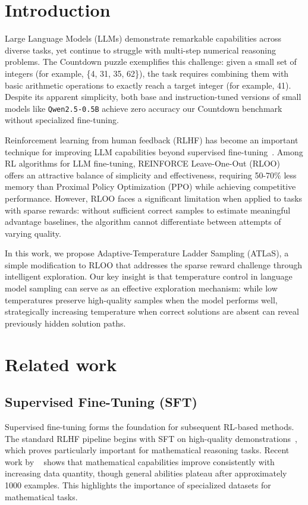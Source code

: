 \documentclass{article}
\begin{document}
\section{Introduction}
Large Language Models (LLMs) demonstrate remarkable capabilities across diverse tasks, yet continue to struggle with multi-step numerical reasoning problems. The Countdown puzzle exemplifies this challenge: given a small set of integers (for example, \{4, 31, 35, 62\}), the task requires combining them with basic arithmetic operations to exactly reach a target integer (for example, 41). Despite its apparent simplicity, both base and instruction-tuned versions of small models like \texttt{Qwen2.5-0.5B} achieve zero accuracy our Countdown benchmark without specialized fine-tuning.

Reinforcement learning from human feedback (RLHF) has become an important technique for improving LLM capabilities beyond supervised fine-tuning~\cite{ouyang2022training}. Among RL algorithms for LLM fine-tuning, REINFORCE Leave-One-Out (RLOO)~\cite{ahmadian2024back} offers an attractive balance of simplicity and effectiveness, requiring 50-70\% less memory than Proximal Policy Optimization (PPO) while achieving competitive performance. However, RLOO faces a significant limitation when applied to tasks with sparse rewards: without sufficient correct samples to estimate meaningful advantage baselines, the algorithm cannot differentiate between attempts of varying quality.

In this work, we propose Adaptive-Temperature Ladder Sampling (ATLaS), a simple modification to RLOO that addresses the sparse reward challenge through intelligent exploration. Our key insight is that temperature control in language model sampling can serve as an effective exploration mechanism: while low temperatures preserve high-quality samples when the model performs well, strategically increasing temperature when correct solutions are absent can reveal previously hidden solution paths.

\section{Related work}

\subsection{Supervised Fine-Tuning (SFT)}

Supervised fine-tuning forms the foundation for subsequent RL-based methods. The standard RLHF pipeline begins with SFT on high-quality demonstrations~\cite{ouyang2022training}, which proves particularly important for mathematical reasoning tasks. Recent work by ~\cite{dong2023abilities} shows that mathematical capabilities improve consistently with increasing data quantity, though general abilities plateau after approximately 1000 examples. This highlights the importance of specialized datasets for mathematical tasks.
\end{document}
